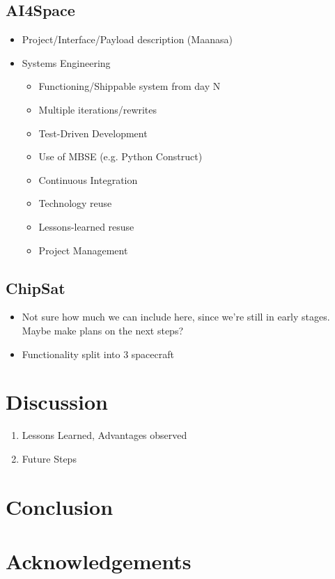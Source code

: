\documentclass[]{iac}
\begin{document}
	\subsection{AI4Space}
 \begin{itemize}
\item Project/Interface/Payload description (Maanasa)
\item Systems Engineering
\begin{itemize}
    \item  Functioning/Shippable system from day N
    \item Multiple iterations/rewrites
    \item Test-Driven Development
    \item Use of MBSE (e.g. Python Construct)
    \item Continuous Integration
    \item Technology reuse
    \item Lessons-learned resuse
    \item Project Management
\end{itemize}
 \end{itemize}
			
	\subsection{ChipSat}
 \begin{itemize}
		\item Not sure how much we can include here, since we're still in early stages. Maybe make plans on the next steps?
		\item Functionality split into 3 spacecraft
  \end{itemize}
\section{Discussion}
\begin{enumerate}
    \item Lessons Learned, Advantages observed
    \item Future Steps
\end{enumerate}
\section{Conclusion}

\vspace{3em}

\section*{Acknowledgements}

\newpage
\printbibliography
\end{document}

